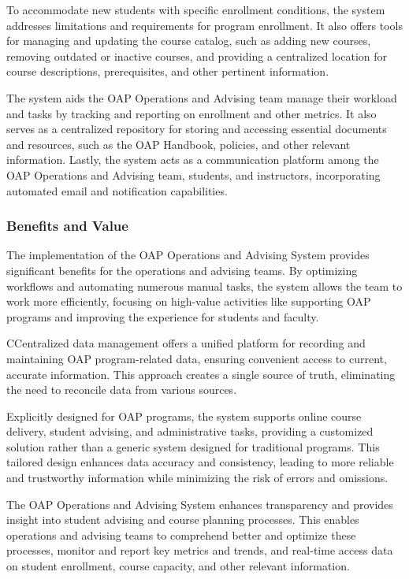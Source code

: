 \documentclass[12pt]{article}
\begin{document}
To accommodate new students with specific enrollment conditions, the system addresses limitations and requirements for program enrollment. It also offers tools for managing and updating the course catalog, such as adding new courses, removing outdated or inactive courses, and providing a centralized location for course descriptions, prerequisites, and other pertinent information.

The system aids the OAP Operations and Advising team manage their workload and tasks by tracking and reporting on enrollment and other metrics. It also serves as a centralized repository for storing and accessing essential documents and resources, such as the OAP Handbook, policies, and other relevant information. Lastly, the system acts as a communication platform among the OAP Operations and Advising team, students, and instructors, incorporating automated email and notification capabilities.

\subsubsection{Benefits and Value}
The implementation of the OAP Operations and Advising System provides significant benefits for the operations and advising teams. By optimizing workflows and automating numerous manual tasks, the system allows the team to work more efficiently, focusing on high-value activities like supporting OAP programs and improving the experience for students and faculty.

CCentralized data management offers a unified platform for recording and maintaining OAP program-related data, ensuring convenient access to current, accurate information. This approach creates a single source of truth, eliminating the need to reconcile data from various sources.

Explicitly designed for OAP programs, the system supports online course delivery, student advising, and administrative tasks, providing a customized solution rather than a generic system designed for traditional programs. This tailored design enhances data accuracy and consistency, leading to more reliable and trustworthy information while minimizing the risk of errors and omissions.

The OAP Operations and Advising System enhances transparency and provides insight into student advising and course planning processes. This enables operations and advising teams to comprehend better and optimize these processes, monitor and report key metrics and trends, and real-time access data on student enrollment, course capacity, and other relevant information.
\end{document}
